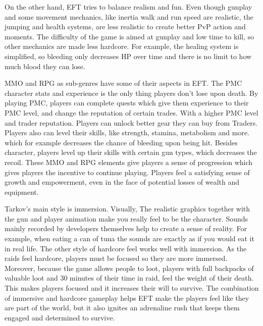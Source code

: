 \documentclass[a4paper,10pt,english]{article}
\begin{document}
On the other hand, EFT tries to balance realism and fun. Even though gunplay and some movement mechanics, like inertia walk and run speed are realistic, the jumping and health systems, are less realistic to create better PvP action and moments. The difficulty of the game is aimed at gunplay and low time to kill, so other mechanics are made less hardcore. For example, the healing system is simplified, so bleeding only decreases HP over time and there is no limit to how much blood they can lose.

MMO and RPG as sub-genres have some of their aspects in EFT. The PMC character stats and experience is the only thing players don't lose upon death. By playing PMC, players can complete quests which give them experience to their PMC level, and change the reputation of certain trades. With a higher PMC level and trader reputation. Players can unlock better gear they can buy from Traders. Players also can level their skills, like strength, stamina, metabolism and more. which for example decreases the chance of bleeding upon being hit. Besides character, players level up their skills with certain gun types, which decreases the recoil. These MMO and RPG elements give players a sense of progression which gives players the incentive to continue playing. Players feel a satisfying sense of growth and empowerment, even in the face of potential losses of wealth and equipment.

Tarkov's main style is immersion. Visually, The realistic graphics together with the gun and player animation make you really feel to be the character. Sounds mainly recorded by developers themselves help to create a sense of reality. For example, when eating a can of tuna the sounds are exactly as if you would eat it in real life. The other style of hardcore feel works well with immersion. As the raids feel hardcore, players must be focused so they are more immersed. Moreover, because the game allows people to loot, players with full backpacks of valuable loot and 30 minutes of their time in raid, feel the weight of their death. This makes players focused and it increases their will to survive. The combination of immersive and hardcore gameplay helps EFT make the players feel like they are part of the world, but it also ignites an adrenaline rush that keeps them engaged and determined to survive.
\end{document}
